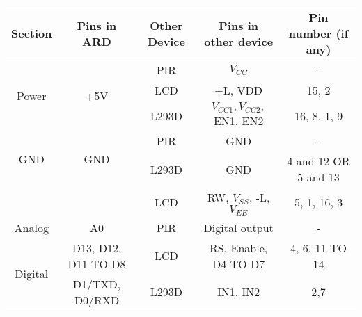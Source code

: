 \begin{table}[H]
    \centering
    \begin{tabular}{|c|c|c|c|c|}
    \hline
    \textbf{Section} & \textbf{Pins in ARD} & \textbf{Other Device} & \textbf{Pins in other device} & \textbf{Pin number (if any)} \\
    \hline
    \multirow{3}{*}{Power} & \multirow{3}{*}{+5V} & PIR & $V_{CC}$ & - \\
    \cline{3-5}
    & & LCD & +L, VDD & 15, 2 \\
    \cline{3-5}
    & & L293D & $V_{CC1}, V_{CC2}, $EN1, EN2 & 16, 8, 1, 9 \\
    \hline
    \multirow{2}{*}{GND} & \multirow{2}{*}{GND} & PIR & GND & - \\
    \cline{3-5}
    & & L293D & GND & 4 and 12 OR 5 and 13 \\
    \cline{3-5}
    & & LCD & RW, $V_{SS}$, -L, $V_{EE}$ & 5, 1, 16, 3 \\
    \hline
    Analog & A0 & PIR & Digital output & - \\
    \hline
    \multirow{3}{*}{Digital} & D13, D12, D11 TO D8 & LCD & RS, Enable, D4 TO D7 & 4, 6, 11 TO 14 \\
    \cline{2-5}
    & D1/TXD, D0/RXD & L293D & IN1, IN2 & 2,7 \\
    \hline
    \end{tabular}
\end{table}
